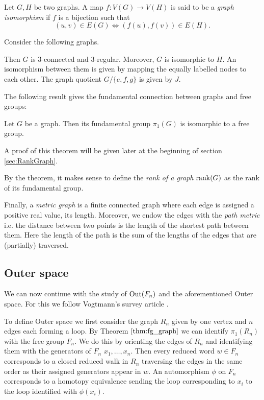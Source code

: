\begin{definition}
	Let $G,H$ be two graphs. A map $f: V(G) \to V(H)$ is said to be a \emph{graph isomorphism} if $f$ is a bijection such that
	\[
		(u,v) \in E(G) \Leftrightarrow (f(u),f(v)) \in E(H)
	.\] 
\end{definition}

\begin{eg}\label{ex:gAuto}
	Consider the following graphs.

	Then $G$ is $3$-connected and $3$-regular. Moreover, $G$ is isomorphic to $H$.
	An isomorphism between them is given by mapping the equally labelled nodes to each other.
	The graph quotient $G / \{e,f,g\}$ is given by $J$.
\end{eg}

The following result gives the fundamental connection between graphs and free groups:
\begin{theorem}\label{thm:fg_graph}
	Let $G$ be a graph. Then its fundamental group $\pi_{1}(G)$ is isomorphic to a free group.
\end{theorem}
A proof of this theorem will be given later at the beginning of section \ref{sec:RankGraph}.

\begin{definition}
	By the theorem, it makes sense to define the \emph{rank of a graph} $\rank(G)$ as the rank of its fundamental group.

	Finally, a \emph{metric graph} is a finite connected graph where each edge is assigned a positive real value, its length. 
	Moreover, we endow the edges with the \emph{path metric} i.e.
	the distance between two points is the length of the shortest path between them.
	Here the length of the path is the sum of the lengths of the edges that are (partially) traversed.
\end{definition}

\subsection{Outer space}
We can now continue with the study of $\operatorname{Out}(F_{n})$ and the aforementioned Outer space. 
For this we follow Vogtmann's survey article \cite{vogtmann02}.

To define Outer space we first consider the graph $R_{n}$ given by one vertex and $n$ edges each forming a loop.
By Theorem $\ref{thm:fg_graph}$ we can identify $\pi_1(R_{n})$ with the free group $F_{n}$.
We do this by orienting the edges of $R_{n}$ and identifying them with the generators of $F_{n}$ $x_1,\ldots,x_{n}$.
Then every reduced word $w \in F_{n}$ corresponds to a closed reduced walk in $R_{n}$ traversing the edges in the same order as their assigned generators appear in $w$.
An automorphism $\phi$ on $F_{n}$ corresponds to a homotopy equivalence sending the loop corresponding to $x_{i}$
to the loop identified with $\phi(x_{i})$.

